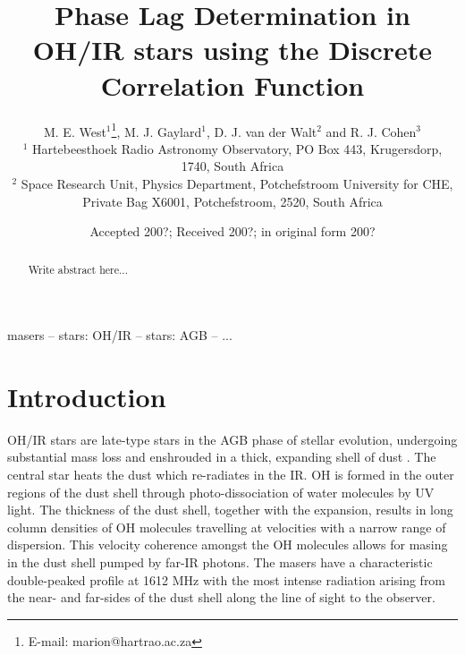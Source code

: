 \documentclass[usenatbib,usegraphicx]{mn2e}
\begin{document}
\title{Phase Lag Determination in OH/IR stars using the Discrete Correlation
Function}

\author[M. E. West et al.]
{M. E. West$^{1}$\thanks{E-mail: marion@hartrao.ac.za}, M. J. 
Gaylard$^{1}$, D. J. van der Walt$^{2}$ and R. J. Cohen$^{3}$
\\ $^1$        Hartebeesthoek Radio Astronomy Observatory, PO Box 443,
Krugersdorp, 1740, South Africa
\\ $^2$       Space Research Unit, Physics Department, Potchefstroom
University for CHE, Private Bag X6001, Potchefstroom, 2520, South Africa
}

\date{Accepted 200?;      Received 200?;      in original form 200?}

\pagerange{\pageref{firstpage}--\pageref{lastpage}}

\maketitle

 \begin{abstract}
Write abstract here...
\end{abstract}

\begin{keywords}
masers -- stars: OH/IR -- stars: AGB -- ...
\end{keywords}

\label{firstpage}

\section{Introduction}

OH/IR stars are late-type stars in the AGB phase of stellar evolution,
undergoing substantial mass loss and enshrouded in a thick, expanding shell
of dust \citep[][review]{WilBar68,RJC89}.  The central star heats the dust
which re-radiates in the IR.  OH is formed in the outer regions of the dust
shell through photo-dissociation of water molecules by UV light.  The
thickness of the dust shell, together with the expansion, results in long
column densities of OH molecules travelling at velocities with a narrow
range of dispersion.  This velocity coherence amongst the OH molecules
allows for masing in the dust shell pumped by far-IR photons.  The masers
have a characteristic double-peaked profile at 1612 MHz
\citep[][review]{WilBar72,RJC89} with the most intense radiation arising
from the near- and far-sides of the dust shell along the line of sight to
the observer.
\end{document}
